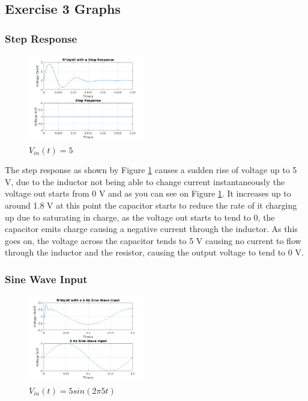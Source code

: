 \documentclass[11pt,a4paper]{article}
\begin{document}
\subsection{Exercise 3 Graphs}
\subsubsection{Step Response}

\begin{figure}

	\vspace{-6mm}
  		\includegraphics[width=0.45\textwidth]{Ex3_Figs/Step.png}
	\vspace{-3mm}
  	\caption{$V_{in}(t)= 5$}
  	\label{fig:ex3g1}

\end{figure}

    \vspace{0mm}The step response as shown by Figure \ref{fig:ex3g1} causes a sudden rise of voltage up to 5 V, due to the inductor not being able to change current instantaneously the voltage out starts from 0 V and as you can see on Figure \ref{fig:ex3g1}. It increases up to around 1.8 V at this point the capacitor starts to reduce the rate of it charging up due to saturating in charge, as the voltage out starts to tend to 0, the capacitor emits charge causing a negative current through the inductor. As this goes on, the voltage across the capacitor tends to 5 V causing no current to flow through the inductor and the resistor, causing the output voltage to tend to 0 V.

\subsubsection{Sine Wave Input}

\begin{figure}
    \vspace{-15mm}
  		\includegraphics[width=0.45\textwidth]{Ex3_Figs/5Sine2.png}
	\vspace{-3mm}
  	\caption{$V_{in}(t)= 5sin(2 \pi 5t)$}
  	\label{fig:ex3g2}

\end{figure}
\end{document}
